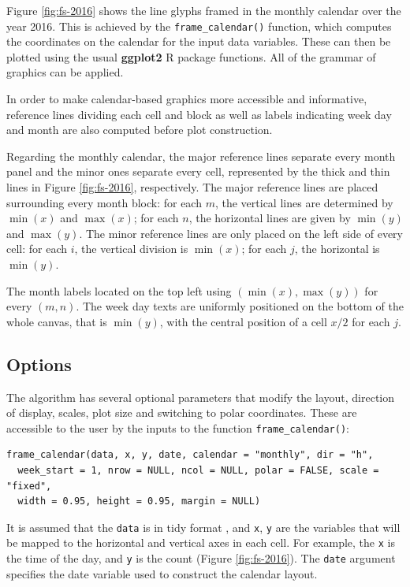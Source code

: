 \documentclass[12pt]{article}
\begin{document}
Figure \ref{fig:fs-2016} shows the line glyphs framed in the monthly calendar over the year 2016. This is achieved by the \texttt{frame\_calendar()} function, which computes the coordinates on the calendar for the input data variables. These can then be plotted using the usual \textbf{ggplot2} R package \citep{R-ggplot2} functions. All of the grammar of graphics can be applied.

In order to make calendar-based graphics more accessible and informative, reference lines dividing each cell and block as well as labels indicating week day and month are also computed before plot construction.

Regarding the monthly calendar, the major reference lines separate every month panel and the minor ones separate every cell, represented by the thick and thin lines in Figure \ref{fig:fs-2016}, respectively. The major reference lines are placed surrounding every month block: for each \(m\), the vertical lines are determined by \(\min{(x)}\) and \(\max{(x)}\); for each \(n\), the horizontal lines are given by \(\min{(y)}\) and \(\max{(y)}\). The minor reference lines are only placed on the left side of every cell: for each \(i\), the vertical division is \(\min{(x)}\); for each \(j\), the horizontal is \(\min{(y)}\).

The month labels located on the top left using \((\min{(x)}, \max{(y)})\) for every \((m, n)\). The week day texts are uniformly positioned on the bottom of the whole canvas, that is \(\min{(y)}\), with the central position of a cell \(x / 2\) for each \(j\).

\hypertarget{sec:opt}{%
\subsection{Options}\label{sec:opt}}

The algorithm has several optional parameters that modify the layout, direction of display, scales, plot size and switching to polar coordinates. These are accessible to the user by the inputs to the function \texttt{frame\_calendar()}:

\begin{verbatim}
frame_calendar(data, x, y, date, calendar = "monthly", dir = "h", 
  week_start = 1, nrow = NULL, ncol = NULL, polar = FALSE, scale = "fixed", 
  width = 0.95, height = 0.95, margin = NULL)
\end{verbatim}

It is assumed that the \texttt{data} is in tidy format \citep{wickham2014tidy}, and \texttt{x}, \texttt{y} are the variables that will be mapped to the horizontal and vertical axes in each cell. For example, the \texttt{x} is the time of the day, and \texttt{y} is the count (Figure \ref{fig:fs-2016}). The \texttt{date} argument specifies the date variable used to construct the calendar layout.
\end{document}
